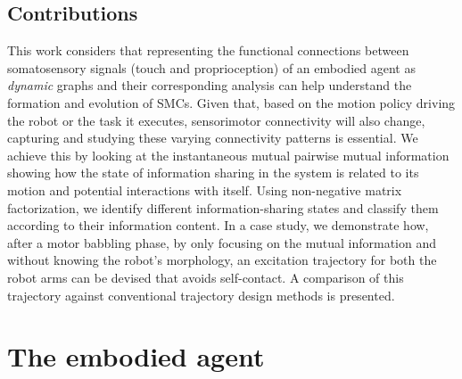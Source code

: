 \subsection{Contributions}
This work considers that representing the functional connections between somatosensory signals (touch and proprioception) of an embodied agent as \emph{dynamic} graphs and their corresponding analysis can help understand the formation and evolution of SMCs. Given that, based on the motion policy driving the robot or the task it executes, sensorimotor connectivity will also change, capturing and studying these varying connectivity patterns is essential. We achieve this by looking at the instantaneous mutual pairwise mutual information showing how the state of information sharing in the system is related to its motion and potential interactions with itself. Using non-negative matrix factorization, we identify different information-sharing states and classify them according to their information content. In a case study, we demonstrate how, after a motor babbling phase, by only focusing on the mutual information and without knowing the robot's morphology, an excitation trajectory for both the robot arms can be devised that avoids self-contact. A comparison of this trajectory against conventional trajectory design methods is presented.

\section{The embodied agent}

